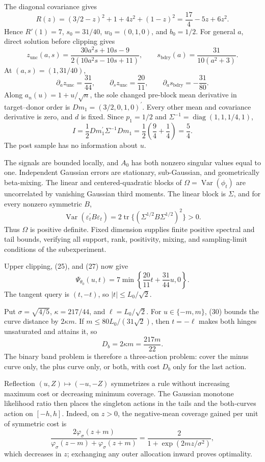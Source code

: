The diagonal covariance gives
\[
 R(z)=(3/2-z)^2+1+4z^2+(1-z)^2
 =\frac{17}{4}-5z+6z^2.
\tag{25}
\]
Hence \(R'(1)=7\), \(s_0=31/40\), \(w_0=(0,1,0)\), and \(b_0=1/2\).  For general \(a\), direct solution before clipping gives
\[
 z_{\mathrm{unc}}(a,s)
 =\frac{30a^2s+10s-9}{2(10a^2s-10s+11)},\qquad
 s_{\mathrm{bdry}}(a)=\frac{31}{10(a^2+3)}.
\tag{26}
\]
At \((a,s)=(1,31/40)\),
\[
 \partial_a z_{\mathrm{unc}}=\frac{31}{44},\qquad
 \partial_s z_{\mathrm{unc}}=\frac{20}{11},\qquad
 \partial_a s_{\mathrm{bdry}}=-\frac{31}{80}.
\tag{27}
\]
Along \(a_n(u)=1+u/\sqrt n\), the sole changed pre-block mean derivative in target--donor order is \(Dm_1=(3/2,0,1,0)^\prime\).  Every other mean and covariance derivative is zero, and \(d\) is fixed.  Since \(p_1=1/2\) and \(\Sigma^{-1}=\operatorname{diag}(1,1,1/4,1)\),
\[
 I=\frac12Dm_1^\prime\Sigma^{-1}Dm_1
 =\frac12\left(\frac94+\frac14\right)=\frac54.
\tag{28}
\]
The post sample has no information about \(u\).

The signals are bounded locally, and \(A_0\) has both nonzero singular values equal to one.  Independent Gaussian errors are stationary, sub-Gaussian, and geometrically beta-mixing.  The linear and centered-quadratic blocks of \(\Omega=\operatorname{Var}(\phi_t)\) are uncorrelated by vanishing Gaussian third moments.  The linear block is \(\Sigma\), and for every nonzero symmetric \(B\),
\[
 \operatorname{Var}(\varepsilon_t^\prime B\varepsilon_t)
 =2\operatorname{tr}\{(\Sigma^{1/2}B\Sigma^{1/2})^2\}>0.
\tag{29}
\]
Thus \(\Omega\) is positive definite.  Fixed dimension supplies finite positive spectral and tail bounds, verifying all support, rank, positivity, mixing, and sampling-limit conditions of the subexperiment.

Upper clipping, (25), and (27) now give
\[
 \Psi_{\theta_0}(u,t)
 =7\min\!\left\{\frac{20}{11}t+\frac{31}{44}u,0\right\}.
\tag{30}
\]
The tangent query is \((t,-t)\), so \(|t|\leq L_0/\sqrt2\).

Put \(\sigma=\sqrt{4/5}\), \(\kappa=217/44\), and \(\ell=L_0/\sqrt2\).  For \(u\in\{-m,m\}\), (30) bounds the curve distance by \(2\kappa m\).  If \(m\leq80L_0/(31\sqrt2)\), then \(t=-\ell\) makes both hinges unsaturated and attains it, so
\[
 D_b=2\kappa m=\frac{217m}{22}.
\tag{31}
\]
The binary band problem is therefore a three-action problem: cover the minus curve only, the plus curve only, or both, with cost \(D_b\) only for the last action.

Reflection \((u,Z)\mapsto(-u,-Z)\) symmetrizes a rule without increasing maximum cost or decreasing minimum coverage.  The Gaussian monotone likelihood ratio then places the singleton actions in the tails and the both-curves action on \([-h,h]\).  Indeed, on \(z>0\), the negative-mean coverage gained per unit of symmetric cost is
\[
 \frac{2\varphi_\sigma(z+m)}
 {\varphi_\sigma(z-m)+\varphi_\sigma(z+m)}
 =\frac{2}{1+\exp(2mz/\sigma^2)},
\]
which decreases in \(z\); exchanging any outer allocation inward proves optimality.

